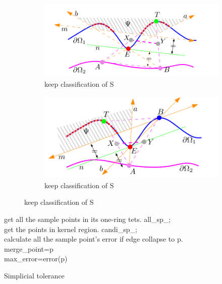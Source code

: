 \documentclass{article}
\theoremstyle{definition}
\theoremstyle{remark}
\begin{document}
  \begin{figure}[h]
      \begin{subfigure}[b]{0.5\textwidth}
        \includegraphics[width=\textwidth]{keep_classification0}
        \caption[a]{keep classification of S}
      \end{subfigure}
      \begin{subfigure}[b]{0.5\textwidth}
        \includegraphics[width=\textwidth]{keep_classification1}
        \caption[b]{keep classification of S}
      \end{subfigure}
  \end{figure}

  \begin{algorithm}[H]
     {
      get all the sample points in its one-ring tets. all\_sp\_;\\
      get the points in kernel region. candi\_sp\_;\\
       {
        calculate all the sample point's error if edge collapse to p.\\
         {
          merge\_point=p\\
          max\_error=error(p)
        }
      }
    }
   \caption{Simplicial tolerance}
\end{algorithm}
\end{document}
